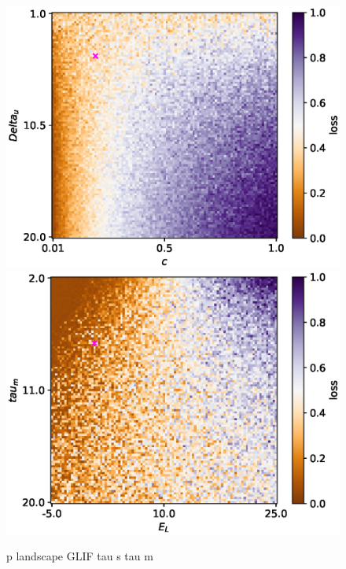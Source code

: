 \documentclass[mphil,deptreport,ianc]{infthesis} %
\begin{document}
\begin{figure}
    \centering
    \vskip -0.1in
    \includegraphics[width=0.9\columnwidth]{figures/param_landscape_heatmaps/microGIF/test_export_2d_heatmap_N_21_loss_c_Delta_u.eps}
    \includegraphics[width=0.9\columnwidth]{figures/param_landscape_heatmaps/microGIF/test_export_2d_heatmap_N_21_loss_E_L_tau_m.eps}
    \vskip -0.1in
    \caption{p landscape GLIF tau s tau m}
    \vskip -0.2in
\end{figure}
\end{document}
